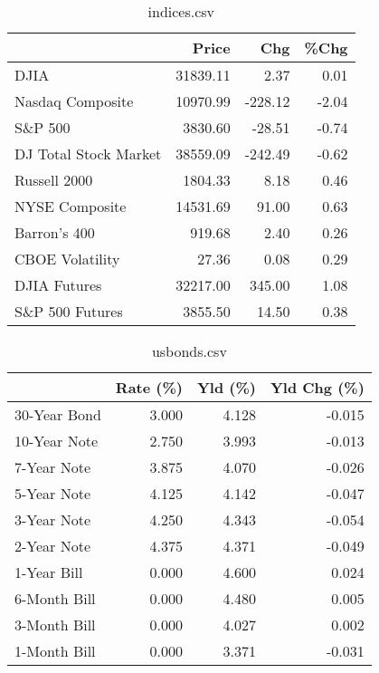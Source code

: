 \documentclass{article}%
\begin{document}
%


\begin{table}[htbp]%
\caption{indices.csv}%
\centering%
\begin{adjustbox}{width=1\textwidth}%
\begin{tabular}{lrrr}
\toprule
                      &    Price &     Chg &  \%Chg \\
\midrule
                 DJIA & 31839.11 &    2.37 &  0.01 \\
     Nasdaq Composite & 10970.99 & -228.12 & -2.04 \\
              S\&P 500 &  3830.60 &  -28.51 & -0.74 \\
DJ Total Stock Market & 38559.09 & -242.49 & -0.62 \\
         Russell 2000 &  1804.33 &    8.18 &  0.46 \\
       NYSE Composite & 14531.69 &   91.00 &  0.63 \\
         Barron's 400 &   919.68 &    2.40 &  0.26 \\
      CBOE Volatility &    27.36 &    0.08 &  0.29 \\
         DJIA Futures & 32217.00 &  345.00 &  1.08 \\
      S\&P 500 Futures &  3855.50 &   14.50 &  0.38 \\
\bottomrule
\end{tabular}
%
\end{adjustbox}%
\end{table}

%


\begin{table}[htbp]%
\caption{usbonds.csv}%
\centering%
\begin{adjustbox}{width=1\textwidth}%
\begin{tabular}{lrrr}
\toprule
             &  Rate (\%) &  Yld (\%) &  Yld Chg (\%) \\
\midrule
30-Year Bond &     3.000 &    4.128 &       -0.015 \\
10-Year Note &     2.750 &    3.993 &       -0.013 \\
 7-Year Note &     3.875 &    4.070 &       -0.026 \\
 5-Year Note &     4.125 &    4.142 &       -0.047 \\
 3-Year Note &     4.250 &    4.343 &       -0.054 \\
 2-Year Note &     4.375 &    4.371 &       -0.049 \\
 1-Year Bill &     0.000 &    4.600 &        0.024 \\
6-Month Bill &     0.000 &    4.480 &        0.005 \\
3-Month Bill &     0.000 &    4.027 &        0.002 \\
1-Month Bill &     0.000 &    3.371 &       -0.031 \\
\bottomrule
\end{tabular}
%
\end{adjustbox}%
\end{table}
\end{document}
